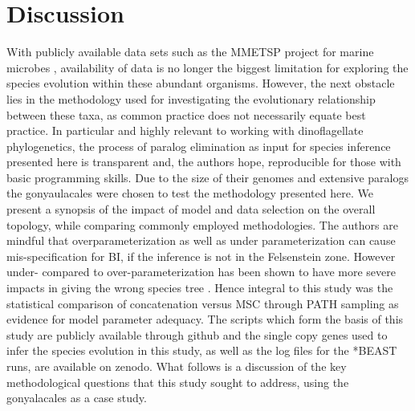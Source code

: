 \documentclass[12pt]{article}
\begin{document}
\newpage
\section{Discussion}
With publicly available data sets such as the MMETSP project for marine microbes \cite{keeling2014marine}, availability of data is no longer the biggest limitation for exploring the species evolution within these abundant organisms. 
However, the next obstacle lies in the methodology used for investigating the evolutionary relationship between these taxa, as common practice does not necessarily equate best practice.
In particular and highly relevant to working with dinoflagellate phylogenetics, the process of paralog elimination as input for species inference presented here is transparent and, the authors hope, reproducible for those with basic programming skills. 
Due to the size of their genomes and extensive paralogs the gonyaulacales were chosen to test the methodology presented here.
We present a synopsis of the impact of model and data selection on the overall topology, while comparing commonly employed methodologies. 
The authors are mindful that overparameterization as well as under parameterization can cause mis-specification for BI, if the inference is not in the Felsenstein zone. 
However under- compared to over-parameterization has been shown to have  more severe impacts in giving the wrong species tree \cite{lemmon2004importance}. 
Hence integral to this study was the statistical comparison of concatenation versus MSC through PATH sampling as evidence for model parameter adequacy. 
The scripts which form the basis of this study are publicly available through github and the single copy genes used to infer the species evolution in this study, as well as the log files for the *BEAST runs, are available on zenodo. 
What follows is a discussion of the key methodological questions that this study sought to address, using the gonyalacales as a case study. 
\end{document}
